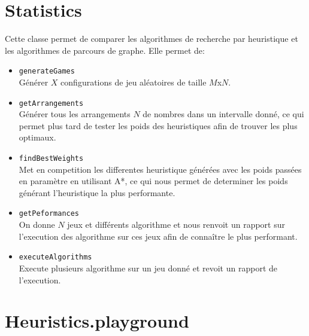 \section{Statistics}
Cette classe permet de comparer les algorithmes de recherche par heuristique et les algorithmes de parcours de graphe. Elle permet de:
\begin{itemize}
      \item \texttt{generateGames} \\
            Générer $X$ configurations de jeu aléatoires de taille $M$x$N$.
      \item \texttt{getArrangements} \\
            Générer tous les arrangements $N$ de nombres dans un intervalle donné, ce qui permet plus tard de tester les poids des heuristiques afin de trouver les plus optimaux.
      \item \texttt{findBestWeights} \\
            Met en competition les differentes heuristique  générées avec les poids passées en paramètre en utilisant A*, ce qui nous permet de determiner les poids générant l'heuristique la plus performante.
      \item \texttt{getPeformances} \\
            On donne $N$ jeux et différents algorithme et nous renvoit un rapport sur l'execution des algorithme sur ces jeux afin de connaître le plus performant.
      \item \texttt{executeAlgorithms} \\
            Execute plusieurs algorithme sur un jeu donné et revoit un rapport de l'execution.
\end{itemize}

\section{Heuristics.playground}

